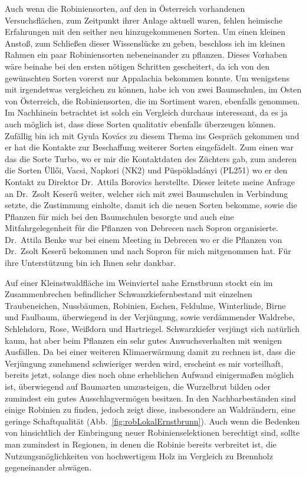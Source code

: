 \documentclass[twocolumn]{scrartcl}
\begin{document}
Auch wenn die Robiniensorten, auf den in Österreich vorhandenen Versuchsflächen,
zum Zeitpunkt ihrer Anlage aktuell waren,
fehlen heimische Erfahrungen mit den seither neu hinzugekommenen Sorten.
Um einen kleinen Anstoß, zum Schließen dieser Wissenslücke zu
geben, beschloss ich im kleinen Rahmen ein paar Robiniensorten
nebeneinander zu pflanzen. Dieses Vorhaben wäre beinahe bei den ersten
nötigen Schritten gescheitert, da ich von den gewünschten Sorten
vorerst nur Appalachia bekommen konnte. Um wenigstens mit irgendetwas
vergleichen zu können, habe ich von zwei Baumschulen, im Osten von
Österreich, die Robiniensorten, die im Sortiment waren, ebenfalls
genommen. Im Nachhinein betrachtet ist solch ein Vergleich durchaus
interessant, da es ja auch möglich ist, dass diese Sorten qualitativ
ebenfalls überzeugen können. Zufällig bin ich mit Gyula Kovács zu
diesem Thema ins Gespräch gekommen und er hat die Kontakte zur
Beschaffung weiterer Sorten eingefädelt. Zum einen war das die Sorte
Turbo, wo er mir die Kontaktdaten des Züchters gab, zum anderen die
Sorten Üllői, Vacsi, Napkori (NK2) und Püspökladányi (PL251)
wo er den
Kontakt zu Direktor Dr.~Attila Borovics herstellte. Dieser leitete
meine Anfrage an Dr.~Zsolt Keserű weiter, welcher sich mit zwei
Baumschulen in Verbindung setzte, die Zustimmung einholte, damit ich
die neuen Sorten bekomme, sowie die Pflanzen für mich bei den
Baumschulen besorgte und auch eine Mitfahrgelegenheit für die Pflanzen
von Debrecen nach Sopron organisierte. Dr.~Attila Benke war bei einem
Meeting in Debrecen wo er die Pflanzen von Dr.~Zsolt Keserű bekommen
und nach Sopron für mich mitgenommen hat.
Für ihre Unterstützung bin ich Ihnen sehr dankbar.

Auf einer Kleinstwaldfläche im Weinviertel nahe Ernstbrunn stockt ein im
Zusammenbrechen befindlicher Schwanzkiefernbestand mit einzelnen Traubeneichen,
Nussbäumen, Robinien, Eschen, Feldulme, Winterlinde, Birne und Faulbaum,
überwiegend in der Verjüngung, sowie verdämmender Waldrebe, Schlehdorn, Rose,
Weißdorn und Hartriegel. Schwarzkiefer verjüngt sich natürlich kaum, hat aber
beim Pflanzen ein sehr gutes Anwuchsverhalten mit wenigen Ausfällen. Da bei
einer weiteren Klimaerwärmung damit zu rechnen ist, dass die Verjüngung
zunehmend schwieriger werden wird, erscheint es mir vorteilhaft, bereits jetzt,
solange dies noch ohne erheblichen Aufwand einigermaßen möglich ist, überwiegend
auf Baumarten umzusteigen, die Wurzelbrut bilden oder zumindest ein gutes
Ausschlagvermögen besitzen. In den Nachbarbeständen sind einige Robinien zu
finden, jedoch zeigt diese, insbesondere an Waldrändern, eine geringe
Schaftqualität (Abb.~\ref{fig:robLokalErnstbrunn}). Auch wenn die Bedenken von
\citet{bouteiller2019robinie} hinsichtlich der Einbringung neuer
Robinienselektionen berechtigt sind, sollte man zumindest in Regionen, in denen
die Robinie bereits verbreitet ist, die Nutzungsmöglichkeiten von hochwertigem
Holz im Vergleich zu Brennholz gegeneinander abwägen.
\end{document}

